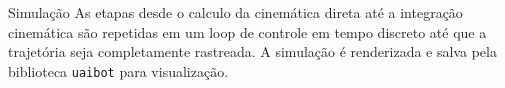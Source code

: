 \documentclass[aspectratio=169]{beamer}
\begin{document}
\begin{frame}{Simulação}
As etapas desde o calculo da cinemática direta até a integração cinemática são repetidas em um loop de controle em tempo discreto até que a trajetória seja completamente rastreada.
A simulação é renderizada e salva pela biblioteca \texttt{uaibot} para visualização.
\end{frame}
\end{document}
